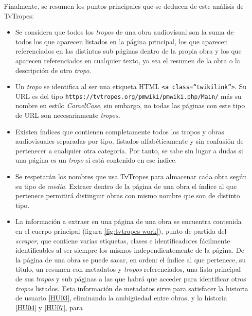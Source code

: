 Finalmente, se resumen los puntos principales que se deducen de este análisis de
TvTropes:
\begin{itemize}
    \item Se considera que todos los \textit{tropos} de una obra audiovisual son
    la suma de todos los que aparecen listados en la página principal, los que
    aparecen referenciados en las distintas sub páginas dentro de la propia obra
    y los que aparecen referenciados en cualquier texto, ya sea el resumen de la
    obra o la descripción de otro \textit{tropo}.
    \item Un \textit{tropo} se identifica al ser una etiqueta HTML \texttt{<a
    class=``twikilink''>}. Su URL es del tipo
    \texttt{https://tvtropes.org/pmwiki/pmwiki.php/Main/} más su nombre en
    estilo \textit{CamelCase}, sin embargo, no todas las páginas con este tipo
    de URL son necesariamente \textit{tropos}.
    \item Existen índices que contienen completamente todos los tropos y obras
    audiovisuales separadas por tipo, listados alfabéticamente y sin confusión
    de pertenecer a cualquier otra categoría. Por tanto, se sabe sin lugar a
    dudas si una página es un \textit{tropo} si está contenido en ese índice.
    \item Se respetarán los nombres que usa TvTropes para almacenar cada obra
    según su tipo de \textit{media}. Extraer dentro de la página de una obra el
    índice al que pertenece permitirá distinguir obras con mismo nombre que son
    de distinto tipo.
    \item La información a extraer en una página de una obra se encuentra
    contenida en el cuerpo principal (figura \ref{fig:tvtropes-work}), punto de
    partida del \textit{scraper}, que contiene varias etiquetas, clases e
    identificadores fácilmente identificables al ser siempre los mismos
    independientemente de la página. De la página de una obra se puede sacar, en
    orden: el índice al que pertenece, su título, un resumen con metadatos y
    \textit{tropos} referenciados, una lista principal de sus \textit{tropos} y
    sub páginas a las que habrá que acceder para identificar otros
    \textit{tropos} listados. Esta información de metadatos sirve para
    satisfacer la historia de usuario
    \href{https://github.com/jlgallego99/TropesToGo/issues/8}{[HU03]},
    eliminando la ambigüedad entre obras, y la historia
    \href{https://github.com/jlgallego99/TropesToGo/issues/9}{[HU04]} y
    \href{https://github.com/jlgallego99/TropesToGo/issues/46}{[HU07]}, para

\end{itemize}
